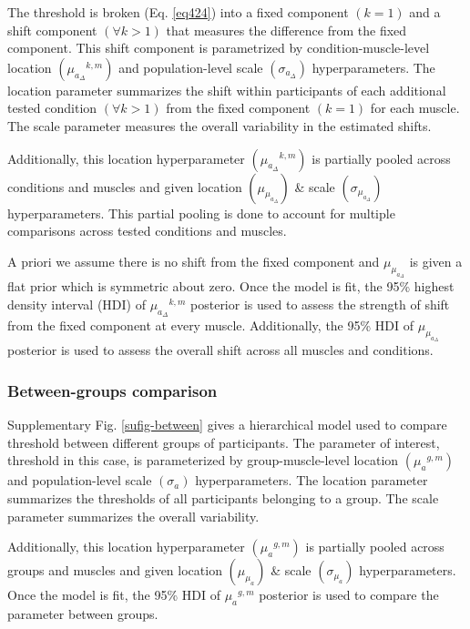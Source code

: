 \documentclass[sn-mathphys-ay]{sn-jnl}%
\theoremstyle{thmstyleone}%
\theoremstyle{thmstyletwo}%
\theoremstyle{thmstylethree}%
\begin{document}
The threshold is broken (Eq. \ref{eq424}) into a fixed component $\left(k = 1\right)$ and a shift component $\left(\forall k > 1\right)$ that measures the difference from the fixed component. This shift component is parametrized by condition-muscle-level location $\left({\mu_{a_{\Delta}}}^{k,m}\right)$ and population-level scale $\left(\sigma_{a_\Delta}\right)$ hyperparameters. The location parameter summarizes the shift within participants of each additional tested condition $\left(\forall k > 1\right)$ from the fixed component $\left(k = 1\right)$ for each muscle. The scale parameter measures the overall variability in the estimated shifts.

Additionally, this location hyperparameter $\left({\mu_{a_{\Delta}}}^{k,m}\right)$ is partially pooled across conditions and muscles and given location $\left(\mu_{\mu_{a_\Delta}}\right)$ \& scale $\left(\sigma_{\mu_{a_\Delta}}\right)$ hyperparameters. This partial pooling is done to account for multiple comparisons \cite{gelman_type_2000,gelman_why_2009} across tested conditions and muscles.

A priori we assume there is no shift from the fixed component and $\mu_{\mu_{a_\Delta}}$ is given a flat prior which is symmetric about zero. Once the model is fit, the 95\% highest density interval (HDI) of ${\mu_{a_{\Delta}}}^{k,m}$ posterior is used to assess the strength of shift from the fixed component at every muscle. Additionally, the 95\% HDI of $\mu_{\mu_{a_\Delta}}$ posterior is used to assess the overall shift across all muscles and conditions.

\subsubsection{Between-groups comparison}
Supplementary Fig. \ref{sufig-between} gives a hierarchical model used to compare threshold between different groups of participants. The parameter of interest, threshold in this case, is parameterized by group-muscle-level location $\left({\mu_a}^{g,m}\right)$ and population-level scale $\left(\sigma_a\right)$ hyperparameters. The location parameter summarizes the thresholds of all participants belonging to a group. The scale parameter summarizes the overall variability.

Additionally, this location hyperparameter $\left({\mu_a}^{g,m}\right)$ is partially pooled across groups and muscles and given location $\left(\mu_{\mu_a}\right)$ \& scale $\left(\sigma_{\mu_a}\right)$ hyperparameters. Once the model is fit, the 95\% HDI of ${\mu_{a}}^{g,m}$ posterior is used to compare the parameter between groups.
\end{document}
